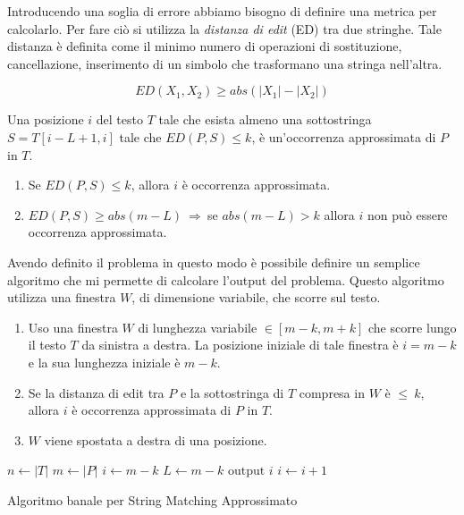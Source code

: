 Introducendo una soglia di errore abbiamo bisogno di definire una metrica per calcolarlo. Per fare ciò si utilizza la \textit{distanza di edit} (ED) tra due stringhe. Tale distanza è definita come il minimo numero di operazioni di sostituzione, cancellazione, inserimento di un simbolo che trasformano una stringa nell'altra.
\begin{nota}
    \begin{equation}
        ED(X_1, X_2) \geq abs(|X_1| - |X_2|)
    \end{equation}
\end{nota}
\begin{definizione}
    Una posizione $i$ del testo $T$ tale che esista almeno una sottostringa $S = T[i - L + 1,i]$ tale che $ED(P, S) \leq k$, è un'occorrenza approssimata di $P$ in $T$.
\end{definizione}
\begin{nota}
    \begin{enumerate}
        \item Se $ED(P, S) \leq k$, allora $i$ è occorrenza approssimata.
        \item $ED(P, S) \geq abs(m - L) \ \Rightarrow \ $se $abs(m - L) > k$ allora $i$ non può essere occorrenza approssimata. 
    \end{enumerate}
\end{nota}

Avendo definito il problema in questo modo è possibile definire un semplice algoritmo che mi permette di calcolare l'output del problema. Questo algoritmo utilizza una finestra $W$, di dimensione variabile, che scorre sul testo.
\begin{enumerate}
    \item Uso una finestra $W$ di lunghezza variabile $\in [m - k, m + k]$ che scorre lungo il testo $T$ da sinistra a destra. La posizione iniziale di tale finestra è $i = m - k$ e la sua lunghezza iniziale è $m - k$.
    \item Se la distanza di edit tra $P$ e la sottostringa di $T$ compresa in $W$ è $\leq \ k$, allora $i$ è occorrenza approssimata di $P$ in $T$.
    \item $W$ viene spostata a destra di una posizione.
\end{enumerate}
\begin{algorithm}
  \begin{algorithmic}
    \State $n\gets |T|$
    \State $m \gets |P|$
    \State $i\gets m - k$
    \State $L \gets  m - k$
            \State $\text{output } i$
        \EndIf
    \EndWhile
    \State $i \gets i + 1$
    \EndWhile
    \EndFunction
  \end{algorithmic}
  \caption{Algoritmo banale per String Matching Approssimato}
\end{algorithm}

